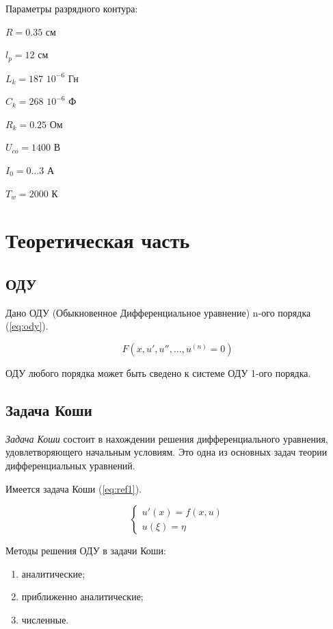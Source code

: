 \documentclass[a4paper,oneside,12pt]{extreport}
\begin{document}
Параметры разрядного контура:

$R = 0.35$ см

$l_p = 12$ см

$L_k = 187$ $10^{-6}$ Гн

$C_k = 268$ $10^{-6}$ Ф

$R_k = 0.25$ Ом

$U_{co} = 1400$ В

$I_0 = 0...3$ А

$T_w = 2000$ К


\newpage

\section{Теоретическая часть}

\subsection{ОДУ}

Дано ОДУ (Обыкновенное Дифференциальное уравнение) n-ого порядка (\ref{eq:ody}).

\begin{equation}
	F(x, u', u'', ... , u^{(n)} = 0)
	\label{eq:ody}
\end{equation}

ОДУ любого порядка может быть сведено к системе ОДУ 1-ого порядка.

\subsection{Задача Коши}

\textit{Задача Коши} состоит в нахождении решения дифференциального уравнения, удовлетворяющего начальным условиям. 
Это одна из основных задач теории дифференциальных уравнений.

Имеется задача Коши (\ref{eq:ref1}).

\begin{equation}
	{\begin{cases}
			u'(x) = f(x,u) \\
			u(\xi) = \eta
		\end{cases}}
		\label{eq:ref1}
\end{equation}

Методы решения ОДУ в задачи Коши:

\begin{enumerate}
	\item аналитические;
	\item приближенно аналитические;
	\item численные.
\end{enumerate}
\end{document}
